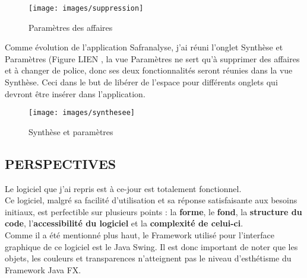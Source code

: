 \begin{figure}[!h]
\center
\texttt{[image: images/suppression]}
\caption{Paramètres des affaires}
\end{figure}

Comme évolution de l’application Safranalyse, j’ai réuni l’onglet Synthèse et Paramètres (Figure LIEN , la vue Paramètres ne sert qu’à supprimer des affaires et à changer de police, donc ses deux fonctionnalités seront réunies dans la vue Synthèse. Ceci dans le but de libérer de l’espace pour différents onglets qui devront être insérer dans l’application.\\

\begin{figure}[!h]
\center
\texttt{[image: images/synthesee]}
\caption{Synthèse et paramètres }
\end{figure}

\subsection{PERSPECTIVES}
Le logiciel que j’ai repris est à ce-jour est totalement fonctionnel.\\

Ce logiciel, malgré sa facilité d’utilisation et sa réponse satisfaisante aux besoins initiaux, est perfectible sur plusieurs points : la \textbf{forme}, le \textbf{fond}, la \textbf{structure du code}, l’\textbf{accessibilité du logiciel} et la \textbf{complexité de celui-ci}.\\

Comme il a été mentionné plus haut, le Framework utilisé pour l’interface graphique de ce logiciel est le Java Swing. Il est donc important de noter que les objets, les couleurs et transparences n’atteignent pas le niveau d’esthétisme du Framework Java FX.\\ 

